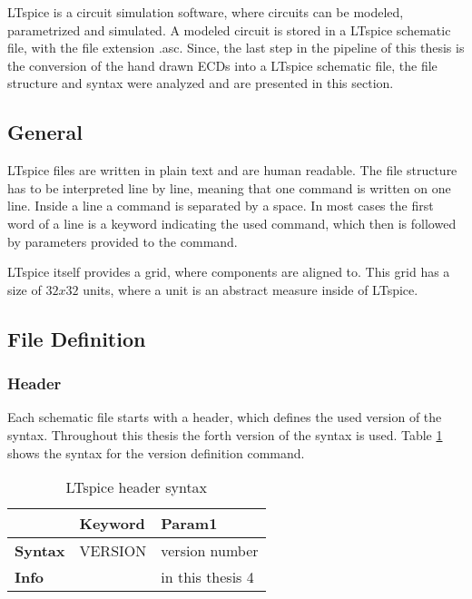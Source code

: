 LTspice is a circuit simulation software, where circuits can be modeled, parametrized and simulated.
A modeled circuit is stored in a LTspice schematic file, with the file extension .asc.
Since, the last step in the pipeline of this thesis is the conversion of the hand drawn \acp{ECD} into a LTspice schematic file, the file structure and syntax were analyzed and are presented in this section.

\subsection{General}
LTspice files are written in plain text and are human readable.
The file structure has to be interpreted line by line, meaning that one command is written on one line.
Inside a line a command is separated by a space.
In most cases the first word of a line is a keyword indicating the used command, which then is followed by parameters provided to the command.

LTspice itself provides a grid, where components are aligned to.
This grid has a size of $32x32$ units, where a unit is an abstract measure inside of LTspice.

\subsection{File Definition}

\subsubsection{Header}

Each schematic file starts with a header, which defines the used version of the syntax.
Throughout this thesis the forth version of the syntax is used. Table \ref{tab:ltheader_syntax} shows the syntax for the version definition command.

\begin{table}[H]
\begin{center}

\begin{tabular}{l|l|l}
    & \textbf{Keyword} & \textbf{Param1}\\
    \hline
    \textbf{Syntax} & VERSION & version number\\
    \textbf{Info} & & in this thesis 4
\end{tabular}
\caption{LTspice header syntax}
\label{tab:ltheader_syntax}

\end{center}
\end{table}


